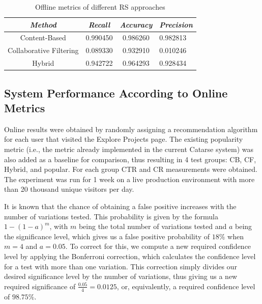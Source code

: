 \documentclass[cic,tc,english]{iiufrgs}
\newcommand{\adriano}[1]{#1}
\begin{document}
\begin{table}[ht!]
    \caption{Offline metrics of different RS approaches}
    \centering
        \begin{tabular}{c|c|c|p{2cm}}
          \hline
          \textit{Method}  &   \textit{Recall}  &   \textit{Accuracy}  &   \textit{Precision} \\
          \hline
          \hline
          Content-Based           &   0.990450           & 0.986260 &  0.982813 \\
          Collaborative Filtering     & 0.089330             & 0.932910  & 0.010246\\
          Hybrid     & 0.942722             & 0.964293  & 0.928434\\
          \hline
        \end{tabular}
    \label{tbl:offline_metrics}
\end{table}

\subsection{System Performance According to Online Metrics} \label{online-evaluation}
Online results were obtained by randomly assigning a recommendation algorithm for each user that visited the Explore Projects page. The existing popularity metric \adriano{(i.e., the metric already implemented in the current Catarse system)} was also added as a baseline for comparison, thus resulting in 4 test groups: CB, CF, Hybrid, and popular. For each group CTR and CR measurements were obtained. The experiment was run for 1 week on a live production environment with more than 20 thousand unique visitors per day.

It is known that the chance of obtaining a false positive increases with the number of variations tested. This probability is given by the formula $1-(1-a)^m$, with $m$ being the total number of variations tested and $a$ being the significance level, which gives us a false positive probability of $18\%$ when $m=4$ and $a=0.05$. To correct for this, we compute a new required confidence level by applying the Bonferroni correction, which calculates the confidence level for a test with more than one variation. This correction simply divides our desired significance level by the number of variations,  thus giving us a new required significance of $\frac{0.05}{4}=0.0125$, or, equivalently, a required confidence level of $98.75\%$. 
\end{document}
